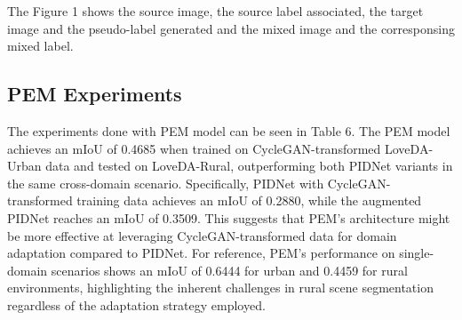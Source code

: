 \documentclass[10pt,twocolumn,letterpaper]{article}
\begin{document}
The Figure 1 shows the source image, the source label associated, the target image and the pseudo-label generated and the mixed image and the corresponsing mixed label. 


\subsection{PEM Experiments}
The experiments done with PEM model can be seen in Table 6. The PEM model achieves an mIoU of 0.4685 when trained on CycleGAN-transformed LoveDA-Urban data and tested on LoveDA-Rural, outperforming both PIDNet variants in the same cross-domain scenario. Specifically, PIDNet with CycleGAN-transformed training data achieves an mIoU of 0.2880, while the augmented PIDNet reaches an mIoU of 0.3509. This suggests that PEM's architecture might be more effective at leveraging CycleGAN-transformed data for domain adaptation compared to PIDNet. For reference, PEM's performance on single-domain scenarios shows an mIoU of 0.6444 for urban and 0.4459 for rural environments, highlighting the inherent challenges in rural scene segmentation regardless of the adaptation strategy employed.

\begin{table}[H]
\centering
{}
\caption{Performance of PEM Model with Different Training and Test Sets}
\end{table}
\end{document}
